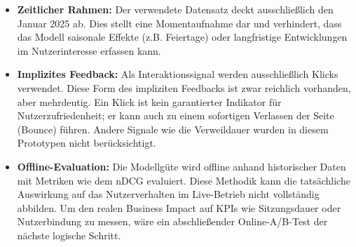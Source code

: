 \begin{itemize}
    \item \textbf{Zeitlicher Rahmen:} Der verwendete Datensatz deckt ausschließlich den Januar 2025 ab. 
    Dies stellt eine Momentaufnahme dar und verhindert, dass das Modell saisonale Effekte (z.B. Feiertage) oder langfristige Entwicklungen im Nutzerinteresse erfassen kann.

    \item \textbf{Implizites Feedback:} Als Interaktionssignal werden ausschließlich Klicks verwendet. 
    Diese Form des impliziten Feedbacks ist zwar reichlich vorhanden, aber mehrdeutig. 
    Ein Klick ist kein garantierter Indikator für Nutzerzufriedenheit; er kann auch zu einem sofortigen Verlassen der Seite (Bounce) führen. 
    Andere Signale wie die Verweildauer wurden in diesem Prototypen nicht berücksichtigt.

    \item \textbf{Offline-Evaluation:} Die Modellgüte wird offline anhand historischer Daten mit Metriken wie dem \ac{nDCG} evaluiert. 
    Diese Methodik kann die tatsächliche Auswirkung auf das Nutzerverhalten im Live-Betrieb nicht vollständig abbilden. 
    Um den realen Business Impact auf KPIs wie Sitzungsdauer oder Nutzerbindung zu messen, wäre ein abschließender Online-A/B-Test der nächste logische Schritt.
\end{itemize}
